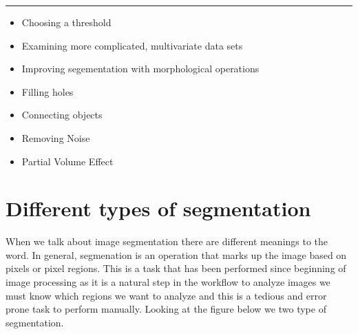 \documentclass[letterpaper,10pt,english]{sphinxmanual}
\begin{document}
\bigskip\hrule\bigskip

\begin{itemize}
\item {} 
\sphinxAtStartPar
Choosing a threshold

\item {} 
\sphinxAtStartPar
Examining more complicated, multivariate data sets

\item {} 
\sphinxAtStartPar
Improving segementation with morphological operations

\item {} 
\sphinxAtStartPar
Filling holes

\item {} 
\sphinxAtStartPar
Connecting objects

\item {} 
\sphinxAtStartPar
Removing Noise

\item {} 
\sphinxAtStartPar
Partial Volume Effect

\end{itemize}


\section{Different types of segmentation}
\label{\detokenize{05-AdvancedSegmentation:different-types-of-segmentation}}
\sphinxAtStartPar
When we talk about image segmentation there are different meanings to the word. In general, segmenation is an operation that marks up the image based on pixels or pixel regions. This is a task that has been performed since beginning of image processing as it is a natural step in the workflow to analyze images \sphinxhyphen{} we must know which regions we want to analyze and this is a tedious and error prone task to perform manually. Looking at the figure below we two type of segmentation.
\end{document}
